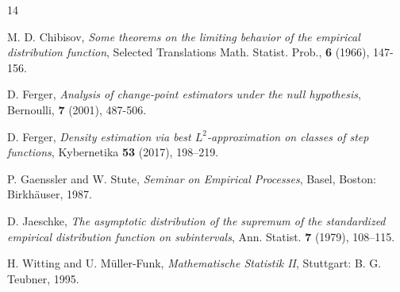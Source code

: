 \documentclass[sn-mathphys,Numbered]{sn-jnl}%
\theoremstyle{thmstyleone}%
\theoremstyle{thmstyletwo}%
\theoremstyle{thmstylethree}%
\begin{document}
\begin{thebibliography}{14}

 M. D. Chibisov, \textit{Some theorems on the limiting behavior of the empirical distribution function},
Selected Translations Math. Statist. Prob., \textbf{6} (1966), 147-156.

 D. Ferger, \textit{Analysis of change-point estimators under the null hypothesis}, Bernoulli, \textbf{7} (2001), 487-506.

 D. Ferger, \textit{Density estimation via best $L^2$-approximation on classes of step functions}, Kybernetika \textbf{53} (2017), 198--219.

 P. Gaenssler and W. Stute, \textit{Seminar on Empirical Processes}, Basel, Boston: Birkh\"{a}user, 1987.

 D. Jaeschke, \textit{The asymptotic distribution of the supremum of the standardized empirical distribution function on subintervals}, Ann. Statist. \textbf{7} (1979), 108--115.

 H. Witting and U. M\"{u}ller-Funk, \textit{Mathematische Statistik II}, Stuttgart: B. G. Teubner, 1995.

    \end{thebibliography}
\end{document}
